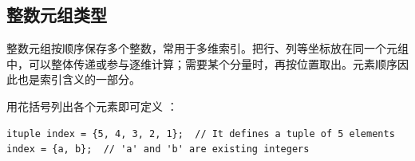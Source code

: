 \subsection*{整数元组类型}

整数元组按顺序保存多个整数，常用于多维索引。把行、列等坐标放在同一个元组中，可以整体传递或参与逐维计算；需要某个分量时，再按位置取出。元素顺序因此也是索引含义的一部分。

用花括号列出各个元素即可定义 \co@ituple@：

\begin{lstlisting}[language=croqtile,caption={整数元组类型}]
ituple index = {5, 4, 3, 2, 1};  // It defines a tuple of 5 elements
index = {a, b};  // 'a' and 'b' are existing integers
\end{lstlisting}
